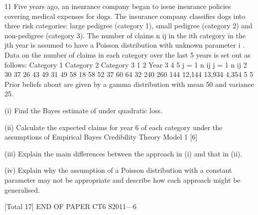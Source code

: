 
11
Five years ago, an insurance company began to issue insurance policies covering
medical expenses for dogs. The insurance company classifies dogs into three risk
categories: large pedigree (category 1), small pedigree (category 2) and non-pedigree
(category 3). The number of claims n ij in the ith category in the jth year is assumed to
have a Poisson distribution with unknown parameter \theta  i . Data on the number of
claims in each category over the last 5 years is set out as follows:
Category 1
Category 2
Category 3
1 2 Year
3 4 5 \sum  j = 1 n ij \sum  j = 1 n ij 2
30
37
26 43
49
31 49
58
18 58
52
37 60
64
32 240
260
144 12,144
13,934
4,354
5
5
Prior beliefs about  are given by a gamma distribution with mean 50 and variance
25.
\item (i) Find the Bayes estimate of  under quadratic loss. 
\item (ii) Calculate the expected claims for year 6 of each category under the
assumptions of Empirical Bayes Credibility Theory Model 1 [6]
\item (iii) Explain the main differences between the approach in (i) and that in  (ii). 
\item (iv) Explain why the assumption of a Poisson distribution with a constant
parameter may not be appropriate and describe how each approach might be
generalised.

[Total 17]
END OF PAPER
CT6 S2011—6

